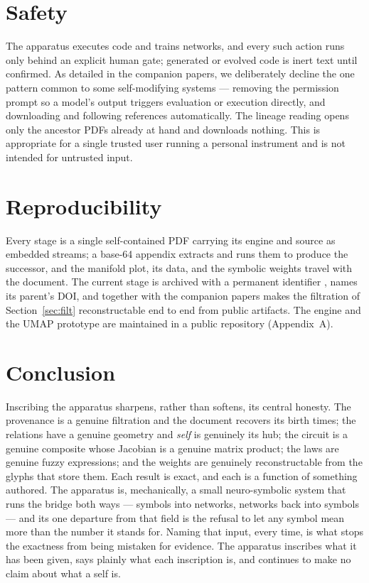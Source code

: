 \documentclass[11pt]{article}
\begin{document}
\section{Safety}
The apparatus executes code and trains networks, and every such action runs only
behind an explicit human gate; generated or evolved code is inert text until
confirmed. As detailed in the companion papers, we deliberately decline the one
pattern common to some self-modifying systems --- removing the permission prompt so
a model's output triggers evaluation or execution directly, and downloading and
following references automatically. The lineage reading opens only the ancestor
PDFs already at hand and downloads nothing. This is appropriate for a single
trusted user running a personal instrument and is not intended for untrusted input.

\section{Reproducibility}
Every stage is a single self-contained PDF carrying its engine and source as
embedded streams; a base-64 appendix extracts and runs them to produce the
successor, and the manifold plot, its data, and the symbolic weights travel with
the document. The current stage is archived with a permanent identifier
\cite{self9}, names its parent's DOI, and together with the companion papers
\cite{paper1,paper2} makes the filtration of Section~\ref{sec:filt} reconstructable
end to end from public artifacts. The engine and the UMAP prototype are maintained
in a public repository (Appendix~A).

\section{Conclusion}
Inscribing the apparatus sharpens, rather than softens, its central honesty. The
provenance is a genuine filtration and the document recovers its birth times; the
relations have a genuine geometry and \emph{self} is genuinely its hub; the circuit
is a genuine composite whose Jacobian is a genuine matrix product; the laws are
genuine fuzzy expressions; and the weights are genuinely reconstructable from the
glyphs that store them. Each result is exact, and each is a function of something
authored. The apparatus is, mechanically, a small neuro-symbolic system that runs
the bridge both ways --- symbols into networks, networks back into symbols --- and
its one departure from that field is the refusal to let any symbol mean more than
the number it stands for. Naming that input, every time, is what stops the
exactness from being mistaken for evidence. The apparatus inscribes what it has
been given, says plainly what each inscription is, and continues to make no claim
about what a self is.
\end{document}

